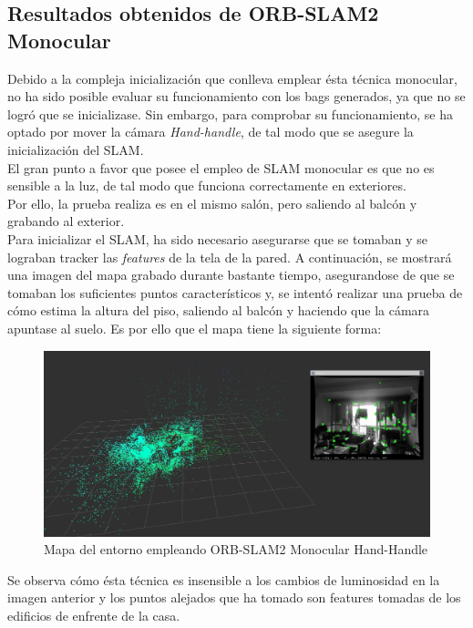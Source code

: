 \subsection{Resultados obtenidos de ORB-SLAM2 Monocular}
Debido a la compleja inicialización que conlleva emplear ésta técnica monocular, no ha sido posible evaluar su funcionamiento con los bags generados, ya que no se logró que se
inicializase. Sin embargo, para comprobar su funcionamiento, se ha optado por mover la cámara \textit{Hand-handle}, de tal modo que se asegure la inicialización del SLAM. \\
El gran punto a favor que posee el empleo de SLAM monocular es que no es sensible a la luz, de tal modo que funciona correctamente en exteriores. \\
Por ello, la prueba realiza es en el mismo salón, pero saliendo al balcón y grabando al exterior. \\

Para inicializar el SLAM, ha sido necesario asegurarse que se tomaban y se lograban tracker las \textit{features} de la tela de la pared. A continuación, se mostrará una imagen
del mapa grabado durante bastante tiempo, asegurandose de que se tomaban los suficientes puntos característicos y, se intentó realizar una prueba de cómo estima la altura del piso, 
saliendo al balcón y haciendo que la cámara apuntase al suelo. Es por ello que el mapa tiene la siguiente forma:

\begin{figure}[h!]
    \centering
    \includegraphics[width=.9\textwidth]{images/slam/mono}
    \caption{Mapa del entorno empleando ORB-SLAM2 Monocular Hand-Handle}
\end{figure}

Se observa cómo ésta técnica es insensible a los cambios de luminosidad en la imagen anterior y los puntos alejados que ha tomado son features tomadas de los edificios de enfrente de la
casa.
